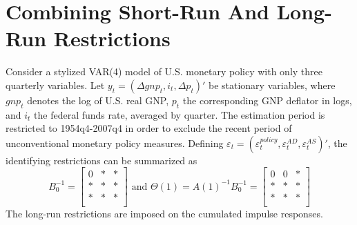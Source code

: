\documentclass[a4paper]{scrartcl}
\begin{document}
    \section{Combining Short-Run And Long-Run Restrictions}
    Consider a stylized VAR(4) model of U.S. monetary policy with only three quarterly variables. Let $y_t = (\Delta gnp_t, i_t, \Delta p_t)'$ be stationary variables, where $gnp_t$ denotes the log of U.S. real GNP, $p_t$ the corresponding GNP deflator in logs, and $i_t$ the federal funds rate, averaged by quarter. The estimation period is restricted to 1954q4-2007q4 in order to exclude the recent period of unconventional monetary policy measures. Defining $\varepsilon_t = (\varepsilon_t^{policy}, \varepsilon_t^{AD}, \varepsilon_t^{AS})'$, the identifying restrictions can be summarized as
    $$B_0^{-1}  = \begin{bmatrix}
            0 & * & * \\
            * & * & * \\
            * & * & * \\
        \end{bmatrix} \text{ and }
        \Theta(1) = A(1)^{-1} B_0^{-1} =  \begin{bmatrix}
            0 & 0 & * \\
            * & * & * \\
            * & * & * \\
        \end{bmatrix}
    $$
    The long-run restrictions are imposed on the cumulated impulse responses.
\end{document}
